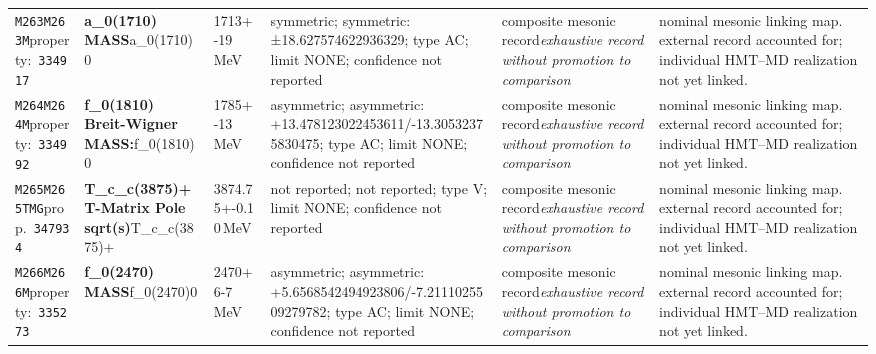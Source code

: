 \begin{landscape}
\begin{longtable}{L{1.85cm}L{4.45cm}L{2.35cm}L{4.05cm}L{3.35cm}L{7.15cm}}
\texttt{M263}\newline \texttt{M263M}\newline property:\ \texttt{334917} & \textbf{a\_\allowbreak{}0(1710) MASS}\newline a\_\allowbreak{}0(1710)0 & 1713+-19\,MeV & symmetric; symmetric: ±18.627574622936329; type AC; limit NONE; confidence not reported & composite mesonic record\newline \emph{exhaustive record without promotion to comparison} & nominal mesonic linking map. external record accounted for; individual HMT--MD realization not yet linked. \\
\texttt{M264}\newline \texttt{M264M}\newline property:\ \texttt{334992} & \textbf{f\_\allowbreak{}0(1810) Breit-Wigner MASS:}\newline f\_\allowbreak{}0(1810)0 & 1785+-13\,MeV & asymmetric; asymmetric: +13.478123022453611/-13.30532375830475; type AC; limit NONE; confidence not reported & composite mesonic record\newline \emph{exhaustive record without promotion to comparison} & nominal mesonic linking map. external record accounted for; individual HMT--MD realization not yet linked. \\
\texttt{M265}\newline \texttt{M265TMG}\newline prop.\ \texttt{347934} & \textbf{T\_\allowbreak{}c\_\allowbreak{}c(3875)+ T-Matrix Pole sqrt(s)}\newline T\_\allowbreak{}c\_\allowbreak{}c(3875)+ & 3874.75+-0.10\,MeV & not reported; not reported; type V; limit NONE; confidence not reported & composite mesonic record\newline \emph{exhaustive record without promotion to comparison} & nominal mesonic linking map. external record accounted for; individual HMT--MD realization not yet linked. \\
\texttt{M266}\newline \texttt{M266M}\newline property:\ \texttt{335273} & \textbf{f\_\allowbreak{}0(2470) MASS}\newline f\_\allowbreak{}0(2470)0 & 2470+6-7\,MeV & asymmetric; asymmetric: +5.6568542494923806/-7.2111025509279782; type AC; limit NONE; confidence not reported & composite mesonic record\newline \emph{exhaustive record without promotion to comparison} & nominal mesonic linking map. external record accounted for; individual HMT--MD realization not yet linked. \\

\end{longtable}
\end{landscape}
